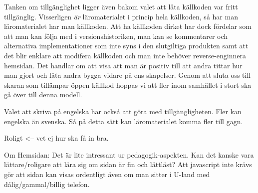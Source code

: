 \begin{binge}
Tanken om tillgänglighet ligger även bakom valet att låta källkoden var fritt tillgänglig. Visserligen \textit{är} läromaterialet i princip hela källkoden, så har man läromaterialet har man källkoden. Att ha källkoden dirket har dock fördelar som att man kan följa med i versionshistoriken, man kan se kommentarer och alternativa implementationer som inte syns i den slutgiltiga produkten samt att det blir enklare att modifera källkoden och man inte behöver reverse-enginnera hemsidan. Det handlar om att visa att man är positiv till att andra tittar hur man gjort och låta andra bygga vidare på ens skapelser. Genom att sluta oss till skaran som tillämpar öppen källkod hoppas vi att fler inom samhället i stort ska gå över till denna modell.

Valet att skriva på engelska har också att göra med tillgängligheten. Fler kan engelska än svenska. Så på detta sätt kan läromaterialet komma fler till gagn.

Roligt <-- vet ej hur ska få in bra.



Om Hemsidan:
  Det är lite intressant ur pedagogik-aspekten. Kan det
  kanske vara lättare/roligare att lära sig om sidan är fin och
  lättläst? Att javascript inte krävs gör att sidan kan visas ordentligt
  även om man sitter i U-land med dålig/gammal/billig telefon.


\end{binge}
